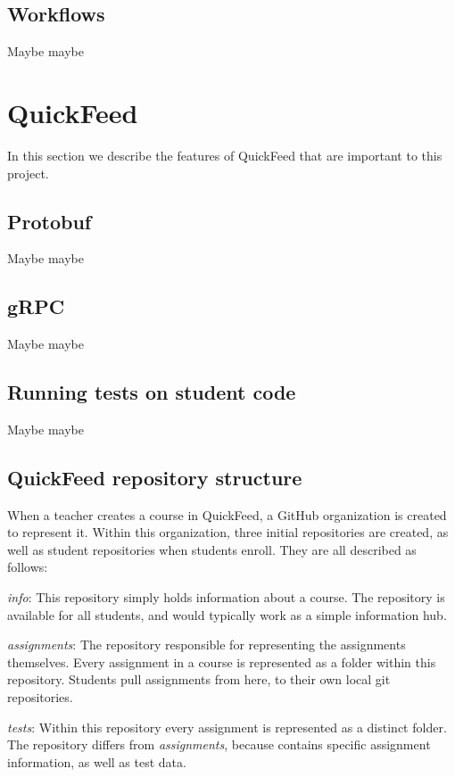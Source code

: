 \subsection{Workflows}

Maybe maybe

\section{QuickFeed}

In this section we describe the features of QuickFeed that are important to this project.

\subsection{Protobuf}

Maybe maybe

\subsection{gRPC}

Maybe maybe

\subsection{Running tests on student code}

Maybe maybe

\subsection{QuickFeed repository structure}

When a teacher creates a course in QuickFeed, a GitHub organization is created to represent it.
Within this organization, three initial repositories are created, as well as student repositories when students enroll.
They are all described as follows:

\textit{info}: This repository simply holds information about a course.
The repository is available for all students, and would typically work as a simple information hub.

\textit{assignments}: The repository responsible for representing the assignments themselves.
Every assignment in a course is represented as a folder within this repository.
Students pull assignments from here, to their own local git repositories.

\textit{tests}: Within this repository every assignment is represented as a distinct folder.
The repository differs from \textit{assignments}, because contains specific assignment information, as well as test data.

